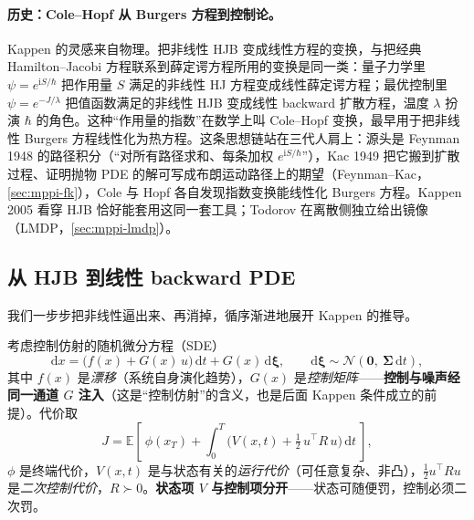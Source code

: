 \paragraph{历史：Cole--Hopf 从 Burgers 方程到控制论。}
Kappen 的灵感来自物理\cite{kappen2005linear}。把非线性 HJB 变成线性方程的变换，与把经典 Hamilton--Jacobi 方程联系到薛定谔方程所用的变换是同一类：量子力学里 $\psi=e^{\mathrm{i}S/\hbar}$ 把作用量 $S$ 满足的非线性 HJ 方程变成线性薛定谔方程；最优控制里 $\psi=e^{-J/\lambda}$ 把值函数满足的非线性 HJB 变成线性 backward 扩散方程，温度 $\lambda$ 扮演 $\hbar$ 的角色。这种“作用量的指数”在数学上叫 Cole--Hopf 变换\cite{hopf1950partial,cole1951quasi}，最早用于把非线性 Burgers 方程线性化为热方程。这条思想链站在三代人肩上：源头是 Feynman 1948 的路径积分\cite{feynman1948spacetime}（“对所有路径求和、每条加权 $e^{\mathrm{i}S/\hbar}$”），Kac 1949 把它搬到扩散过程、证明抛物 PDE 的解可写成布朗运动路径上的期望（Feynman--Kac，\cref{sec:mppi-fk}）\cite{kac1949distributions}，Cole 与 Hopf 各自发现指数变换能线性化 Burgers 方程\cite{cole1951quasi,hopf1950partial}。Kappen 2005 看穿 HJB 恰好能套用这同一套工具\cite{kappen2005linear,kappen2005path}；Todorov 在离散侧独立给出镜像（LMDP，\cref{sec:mppi-lmdp}）\cite{todorov2009efficient}。

\subsection{从 HJB 到线性 backward PDE}
\label{sec:mppi-derivation}

我们一步步把非线性逼出来、再消掉，循序渐进地展开 Kappen 的推导。

\begin{definition}[控制仿射随机最优控制问题]\label{def:mppi-problem}
考虑控制仿射的随机微分方程（SDE）
\begin{equation}
  \mathrm{d}x=\big(f(x)+G(x)\,u\big)\,\mathrm{d}t+G(x)\,\mathrm{d}\boldsymbol{\xi},\qquad \mathrm{d}\boldsymbol{\xi}\sim\mathcal{N}(\mathbf{0},\ \boldsymbol{\Sigma}\,\mathrm{d}t),
  \label{eq:mppi-sde}
\end{equation}
其中 $f(x)$ 是\emph{漂移}（系统自身演化趋势），$G(x)$ 是\emph{控制矩阵}——\textbf{控制与噪声经同一通道 $G$ 注入}（这是“控制仿射”的含义，也是后面 Kappen 条件成立的前提）。代价取
\begin{equation}
  J=\mathbb{E}\!\left[\ \phi(x_T)+\int_0^T\Big(V(x,t)+\tfrac12\,u^\top R\,u\Big)\,\mathrm{d}t\ \right],
  \label{eq:mppi-cost}
\end{equation}
$\phi$ 是终端代价，$V(x,t)$ 是与状态有关的\emph{运行代价}（可任意复杂、非凸），$\tfrac12 u^\top R u$ 是\emph{二次控制代价}，$R\succ0$。\textbf{状态项 $V$ 与控制项分开}——状态可随便罚，控制必须二次罚。
\end{definition}

